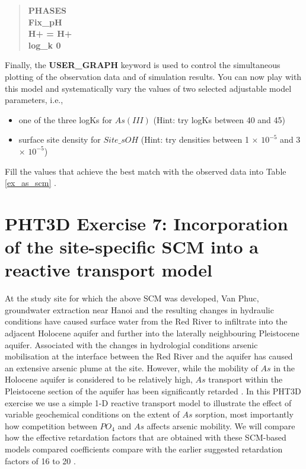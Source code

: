 \begin{quote}
{\color{blue}\textbf{PHASES}}\\
{\color{blue}\textbf{Fix\_pH}} \\
{\color{blue}\textbf{H+ = H+}}\\ 	
{\color{blue}\textbf{log\_k	0 }}\\
\end{quote}

Finally, the {\color{blue}\textbf{USER\_GRAPH}} keyword is used to control 
the simultaneous plotting of the observation data and of 
simulation results. You can now play with this model and systematically
vary the values of two selected adjustable model parameters, i.e.,
\begin{itemize}
\item one of the three logKs for $As(III)$ (Hint: try logKs between 40 and 45)
\item surface site density for $Site\_sOH$ (Hint: try densities 
between 1 $\times$ $10^{-5}$ and 3 $\times$ $10^{-5}$)
\end{itemize}

Fill the values that achieve the best match with the observed data into Table \ref{ex_as_scm} .



\section[PHT3D Exercise 7: Incorporation of the site-specific SCM into a reactive transport model]{PHT3D Exercise 7: Incorporation of the site-specific SCM into a reactive transport model}

At the study site for which the above SCM was developed, Van Phuc, groundwater extraction near Hanoi and the resulting changes in hydraulic conditions have caused surface water from the Red River to infiltrate into the  adjacent Holocene aquifer and further into the laterally neighbouring Pleistocene aquifer. 
Associated with the changes in hydrologial conditions arsenic mobilisation at the interface 
between the Red River and the aquifer has caused an extensive arsenic plume at the site. 
However, while the mobility of $As$ in the Holocene aquifer is considered to be relatively high, 
$As$ transport within the Pleistocene section of the aquifer has been significantly retarded \citep{vangeen2013}. In this PHT3D exercise we use a simple 1-D reactive transport model to illustrate the effect of variable geochemical conditions on the extent of $As$ sorption, most importantly how competition between $PO_4$ and $As$ affects arsenic mobility. We will compare how the effective retardation factors that are obtained with these SCM-based models compared coefficients compare with the earlier suggested retardation factors of 16 to 20 \citep{vangeen2013}. 

